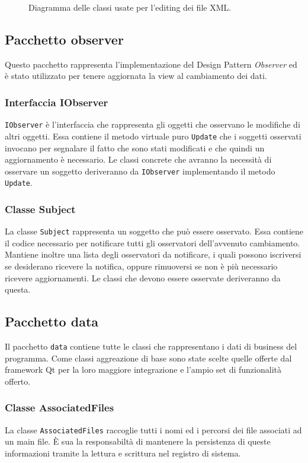 		\begin{figure}[!h] 
			\centering 
			\caption{Diagramma delle classi usate per l'editing dei file XML.}
		\end{figure}

\newpage

\subsection{Pacchetto observer}
Questo pacchetto rappresenta l'implementazione del Design Pattern \textit{Observer} ed è stato utilizzato per tenere aggiornata la view al cambiamento dei dati.

	\subsubsection{Interfaccia IObserver}
		\texttt{IObserver} è l'interfaccia che rappresenta gli oggetti che osservano le modifiche di altri oggetti. Essa contiene il metodo virtuale puro \texttt{Update} che i soggetti osservati invocano per segnalare il fatto che sono stati modificati e che quindi un aggiornamento è necessario. Le classi concrete che avranno la necessità di osservare un soggetto deriveranno da \texttt{IObserver} implementando il metodo \texttt{Update}.

	\subsubsection{Classe Subject}
		La classe \texttt{Subject} rappresenta un soggetto che può essere osservato. Essa contiene il codice necessario per notificare tutti gli osservatori dell'avvenuto cambiamento. Mantiene inoltre una lista degli osservatori da notificare, i quali possono iscriversi se desiderano ricevere la notifica, oppure rimuoversi se non è più necessario ricevere aggiornamenti. Le classi che devono essere osservate deriveranno da questa.

\subsection{Pacchetto data}
	Il pacchetto \texttt{data} contiene tutte le classi che rappresentano i dati di business del programma. Come classi aggreazione di base sono state scelte quelle offerte dal framework Qt per la loro maggiore integrazione e l'ampio set di funzionalità offerto.

	\subsubsection{Classe AssociatedFiles}
		La classe \texttt{AssociatedFiles} raccoglie tutti i nomi ed i percorsi dei file associati ad un main file. È sua la responsabiltà di mantenere la persistenza di queste informazioni tramite la lettura e scrittura nel registro di sistema.
	
